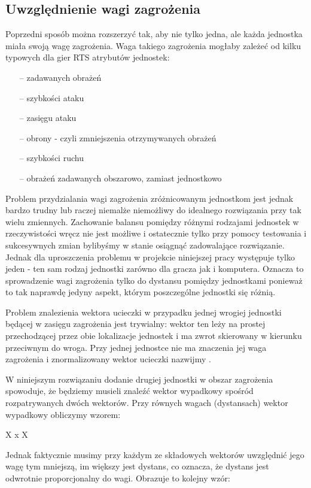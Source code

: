\documentclass[12pt]{report}
\begin{document}
\subsection{Uwzględnienie wagi zagrożenia}
Poprzedni sposób można rozszerzyć tak, aby nie tylko jedna, ale każda jednostka miała swoją wagę zagrożenia. Waga takiego zagrożenia mogłaby zależeć od kilku typowych dla gier RTS atrybutów jednostek:
\begin{itemize}
\item[--] zadawanych obrażeń
\item[--] szybkości ataku
\item[--] zasięgu ataku
\item[--] obrony - czyli zmniejszenia otrzymywanych obrażeń
\item[--] szybkości ruchu
\item[--] obrażeń zadawanych obszarowo, zamiast jednostkowo
\end{itemize}
Problem przydzialania wagi zagrożenia zróżnicowanym jednostkom jest jednak bardzo trudny lub raczej niemalże niemożliwy do idealnego rozwiązania przy tak wielu zmiennych. Zachowanie balansu pomiędzy różnymi rodzajami jednostek w rzeczywistości wręcz nie jest możliwe i ostatecznie tylko przy pomocy testowania i sukcesywnych zmian bylibyśmy w stanie osiągnąć zadowalające rozwiązanie. 
Jednak dla uproszczenia problemu w projekcie niniejszej pracy występuje tylko jeden - ten sam rodzaj jednostki zarówno dla gracza jak i komputera. Oznacza to sprowadzenie wagi zagrożenia tylko do dystansu pomiędzy jednostkami ponieważ to tak naprawdę jedyny aspekt, którym poszczególne jednostki się różnią. 


Problem znalezienia wektora ucieczki w przypadku jednej wrogiej jednostki będącej w zasięgu zagrożenia jest trywialny:
wektor ten leży na prostej przechodzącej przez obie lokalizacje jednostek i ma zwrot skierowany w kierunku przeciwnym do wroga. Przy jednej jednostce nie ma znaczenia jej waga zagrożenia i znormalizowany wektor ucieczki nazwijmy .


W niniejszym rozwiązaniu dodanie drugiej jednostki w obszar zagrożenia spowoduje, że będziemy musieli znaleźć wektor wypadkowy spośród rozpatrywanych dwóch wektorów. Przy równych wagach (dystansach) wektor wypadkowy obliczymy wzorem:

X x X

Jednak faktycznie musimy przy każdym ze składowych wektorów uwzględnić jego wagę tym mniejszą, im większy jest dystans, co oznacza, że dystans jest odwrotnie proporcjonalny do wagi. Obrazuje to kolejny wzór:
\end{document}
